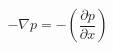 \documentclass[preview,border=2pt]{standalone}
\begin{document}
\[
-\nabla p = -\left(\frac{\partial p}{\partial x}\right)
\]
\end{document}
